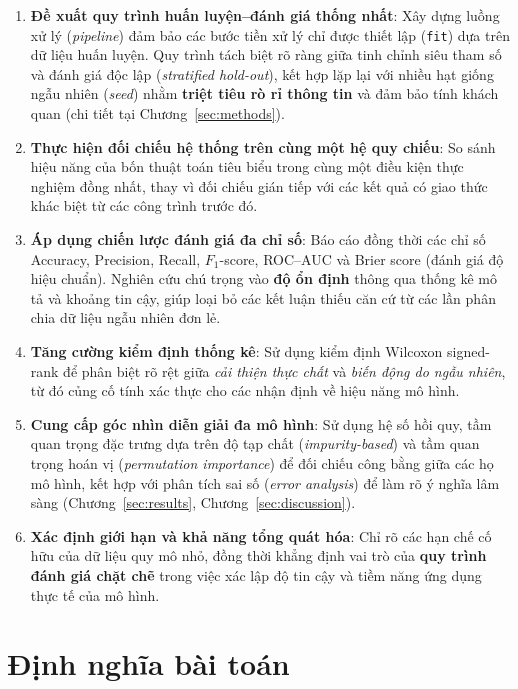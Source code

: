 \documentclass[14pt,a4paper]{extreport}
\begin{document}
\begin{enumerate}
  \item \textbf{Đề xuất quy trình huấn luyện--đánh giá thống nhất}: Xây dựng luồng xử lý (\textit{pipeline}) đảm bảo các bước tiền xử lý chỉ được thiết lập (\texttt{fit}) dựa trên dữ liệu huấn luyện. Quy trình tách biệt rõ ràng giữa tinh chỉnh siêu tham số và đánh giá độc lập (\textit{stratified hold-out}), kết hợp lặp lại với nhiều hạt giống ngẫu nhiên (\textit{seed}) nhằm \textbf{triệt tiêu rò rỉ thông tin} và đảm bảo tính khách quan (chi tiết tại Chương~\ref{sec:methods}).
  \item \textbf{Thực hiện đối chiếu hệ thống trên cùng một hệ quy chiếu}: So sánh hiệu năng của bốn thuật toán tiêu biểu trong cùng một điều kiện thực nghiệm đồng nhất, thay vì đối chiếu gián tiếp với các kết quả có giao thức khác biệt từ các công trình trước đó.
  \item \textbf{Áp dụng chiến lược đánh giá đa chỉ số}: Báo cáo đồng thời các chỉ số Accuracy, Precision, Recall, $F_1$-score, ROC--AUC và Brier score (đánh giá độ hiệu chuẩn). Nghiên cứu chú trọng vào \textbf{độ ổn định} thông qua thống kê mô tả và khoảng tin cậy, giúp loại bỏ các kết luận thiếu căn cứ từ các lần phân chia dữ liệu ngẫu nhiên đơn lẻ.
  \item \textbf{Tăng cường kiểm định thống kê}: Sử dụng kiểm định Wilcoxon signed-rank để phân biệt rõ rệt giữa \emph{cải thiện thực chất} và \emph{biến động do ngẫu nhiên}, từ đó củng cố tính xác thực cho các nhận định về hiệu năng mô hình.
  \item \textbf{Cung cấp góc nhìn diễn giải đa mô hình}: Sử dụng hệ số hồi quy, tầm quan trọng đặc trưng dựa trên độ tạp chất (\textit{impurity-based}) và tầm quan trọng hoán vị (\textit{permutation importance}) để đối chiếu công bằng giữa các họ mô hình, kết hợp với phân tích sai số (\textit{error analysis}) để làm rõ ý nghĩa lâm sàng (Chương~\ref{sec:results}, Chương~\ref{sec:discussion}).
  \item \textbf{Xác định giới hạn và khả năng tổng quát hóa}: Chỉ rõ các hạn chế cố hữu của dữ liệu quy mô nhỏ, đồng thời khẳng định vai trò của \textbf{quy trình đánh giá chặt chẽ} trong việc xác lập độ tin cậy và tiềm năng ứng dụng thực tế của mô hình.
\end{enumerate}

\section{Định nghĩa bài toán}
\end{document}
